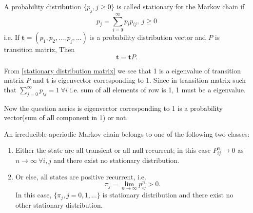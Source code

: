 \begin{definition}
    \label{Stationary distribution}
    A probability distribution $ \{p_{j},j\ge 0\} $ is called stationary for the Markov chain if 
    \begin{equation}
        \label{1st stationary distribution}
        p_{j} = \sum_{i=0}^{\infty} p_{i}p_{ij},\ j \ge 0
    \end{equation}
    i.e. If $ \mathbf{t}=(p_{1},p_{2},\ldots,p_{j},\ldots) $ is a probability distribution vector and $ P $ is transition matrix, Then
    \begin{equation}
        \label{stationary distribution matrix}
         \mathbf{t}=\mathbf{t}P.
    \end{equation}
\end{definition}

From \cref{stationary distribution matrix} we see that 1 is a eigenvalue of transition matrix $ P $ and  $ \mathbf{t} $ is eigenvector corresponding
to 1. Since in transition matrix  such that  $ \sum_{j=0}^{\infty} p_{ij} = 1\ \forall i$ i.e. sum of all elements of row is 1,
1 must be a eigenvalue.

Now the question aeries is eigenvector corresponding to 1 is a probability vector(sum of all component in 1) or not.

\begin{theorem}
    An irreducible aperiodic Markov chain belongs to one of the following two classes:
    \begin{enumerate}
        \item Either the state are all transient or all null recurrent; in this case $ P^{n}_{ij}\to 0 $ as $ n\to \infty \ \forall i,j $
            and there exist no stationary distribution.
        \item Or else, all states are positive recurrent, i.e.
            \[
                \pi_{j} = \lim_{n\to \infty}p_{ij}^{n}>0.
            \]
            In this case, $ \{\pi_{j},j=0,1,\ldots\} $ is stationary distribution and there exist no other stationary distribution.
    \end{enumerate}
\end{theorem}
